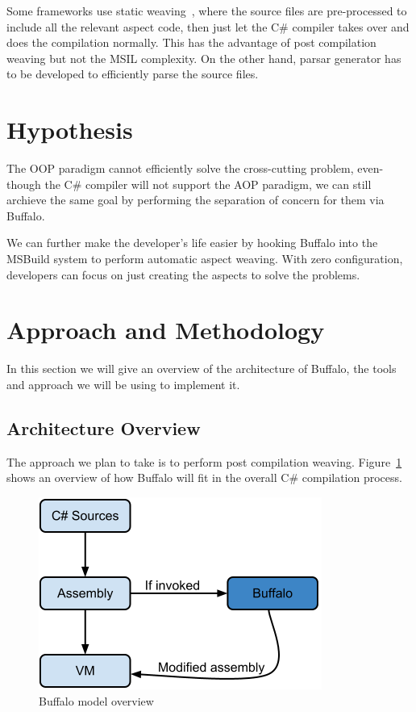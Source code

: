 Some frameworks use static weaving~\cite{aspectcs}, where the source files are pre-processed to include all the relevant aspect code, then just let the C\# compiler takes over and does the compilation normally. This has the advantage of post compilation weaving but not the MSIL complexity. On the other hand, parsar generator has to be developed to efficiently parse the source files.

\section{Hypothesis}
The OOP paradigm cannot efficiently solve the cross-cutting problem, even-though the C\# compiler will not support the AOP paradigm, we can still archieve the same goal by performing the separation of concern for them via Buffalo.

We can further make the developer's life easier by hooking Buffalo into the MSBuild system to perform automatic aspect weaving. With zero configuration, developers can focus on just creating the aspects to solve the problems.

\section{Approach and Methodology}
In this section we will give an overview of the architecture of Buffalo, the tools and approach we will be using to implement it.

\subsection{Architecture Overview}
The approach we plan to take is to perform post compilation weaving. Figure~\ref{buffalo_model} shows an overview of how Buffalo will fit in the overall C\# compilation process.

\begin{figure}[here]
  \includegraphics[scale=0.70]{model_overview.png}
  \caption{Buffalo model overview\label{buffalo_model}}
\end{figure}

